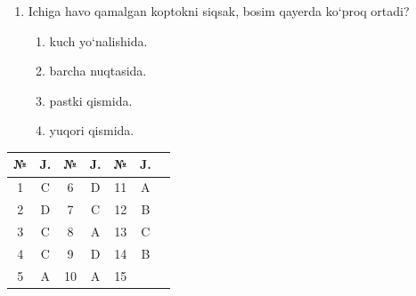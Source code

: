 \begin{enumerate}
\item Ichiga havo qamalgan koptokni siqsak, bosim qayerda ko‘proq ortadi? 
\begin{enumerate}[label=\Alph*)]
\item kuch yo‘nalishida.
\item barcha nuqtasida.
\item pastki qismida.
\item yuqori qismida.

\end{enumerate}
\end{enumerate}





\begin{table}[h!]
\centering
\begin{tabular}{|c|c|c|c|c|c|c|}
\hline
№ & J. & № & J. & № & J.  \\ \hline
1 & C & 6 & D & 11 & A \\ \hline
2 & D & 7 & C & 12 & B \\ \hline
3 & C & 8 & A & 13 & C \\ \hline
4 & C & 9 & D & 14 & B  \\ \hline
5 & A & 10 & A & 15 &   \\ \hline
\end{tabular}
\end{table}